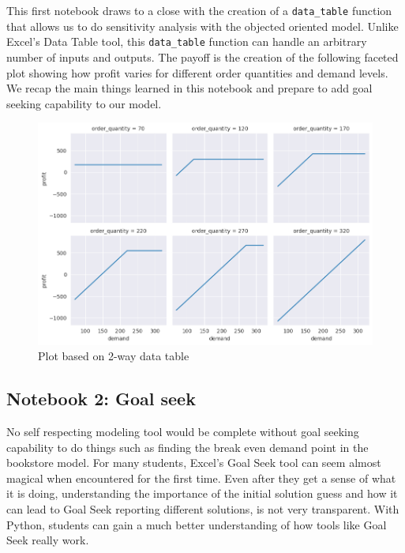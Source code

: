 \documentclass[ited,blindrev]{informs3}              %
\newcommand{\code}[1]{\texttt{#1}}
\begin{document}
This first notebook draws to a close with the creation of a \code{data\_table} function that allows us to do sensitivity analysis with the objected oriented model. Unlike Excel's Data Table tool, this \code{data\_table} function can handle an arbitrary number of inputs and outputs. The payoff is the creation of the following faceted plot showing how profit varies for different order quantities and demand levels. We recap the main things learned in this notebook and prepare to add goal seeking capability to our model.

\begin{figure}[!ht]
	\centering
	\begin{minipage}{.80\textwidth}
		\includegraphics[width=1.0\textwidth]{images/two_way_dt.png}
	\end{minipage}
	\caption{Plot based on 2-way data table}
	\label{fig:2way_dt}
\end{figure}


\subsection{Notebook 2: Goal seek}

No self respecting modeling tool would be complete without goal seeking capability to do things such as finding the break even demand point in the bookstore model. For many students, Excel's Goal Seek tool can seem almost magical when encountered for the first time. Even after they get a sense of what it is doing, understanding the importance of the initial solution guess and how it can lead to Goal Seek reporting different solutions, is not very transparent. With Python, students can gain a much better understanding of how tools like Goal Seek really work. 
\end{document}
